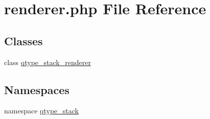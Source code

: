 \hypertarget{renderer_8php}{
\section{renderer.php File Reference}
\label{renderer_8php}
}
\subsection*{Classes}
\begin{DoxyCompactItemize}
\item 
class \hyperlink{classqtype__stack__renderer}{qtype\_\-stack\_\-renderer}
\end{DoxyCompactItemize}
\subsection*{Namespaces}
\begin{DoxyCompactItemize}
\item 
namespace \hyperlink{namespaceqtype__stack}{qtype\_\-stack}
\end{DoxyCompactItemize}
